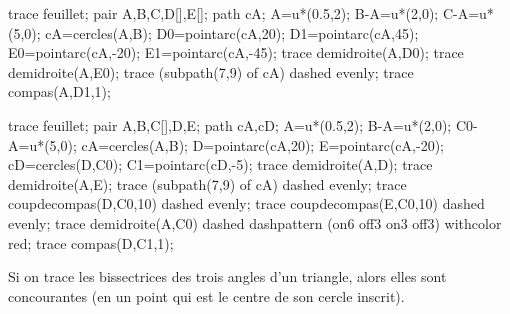 \begin{changemargin}{0mm}{-15mm}
\begin{remarque}
\begin{center}
            \begin{Geometrie}[CoinHD={u*(7,4)}]
                trace feuillet;
                pair A,B,C,D[],E[];
                path cA;
                A=u*(0.5,2);
                B-A=u*(2,0);
                C-A=u*(5,0);
                cA=cercles(A,B);
                D0=pointarc(cA,20);
                D1=pointarc(cA,45);
                E0=pointarc(cA,-20);
                E1=pointarc(cA,-45);
                trace demidroite(A,D0);
                trace demidroite(A,E0);
                trace (subpath(7,9) of cA) dashed evenly;
                trace compas(A,D1,1);
            \end{Geometrie}
            \begin{Geometrie}[CoinHD={u*(7,4)}]
                trace feuillet;
                pair A,B,C[],D,E;
                path cA,cD;
                A=u*(0.5,2);
                B-A=u*(2,0);
                C0-A=u*(5,0);
                cA=cercles(A,B);
                D=pointarc(cA,20);
                E=pointarc(cA,-20);
                cD=cercles(D,C0);
                C1=pointarc(cD,-5);
                trace demidroite(A,D);
                trace demidroite(A,E);
                trace (subpath(7,9) of cA) dashed evenly;
                trace coupdecompas(D,C0,10) dashed evenly;
                trace coupdecompas(E,C0,10) dashed evenly;
                trace demidroite(A,C0) dashed dashpattern (on6 off3 on3 off3) withcolor red;
                trace compas(D,C1,1);
            \end{Geometrie}
        \end{center}
    \end{remarque}

    \begin{propriete}
        Si on trace les bissectrices des trois angles d'un triangle, alors elles sont concourantes (en un point qui est le centre de son cercle inscrit).
    \end{propriete}

\end{changemargin}


